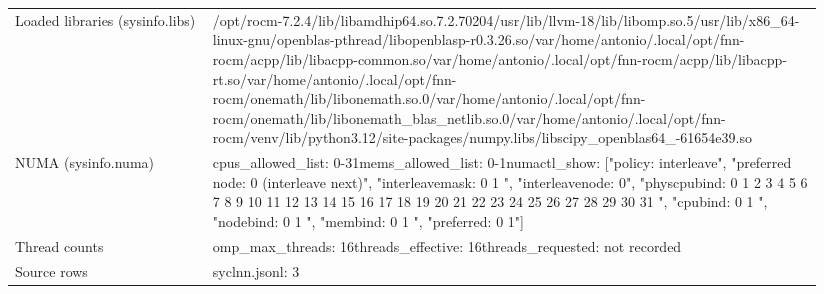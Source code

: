 \begin{longtable}{>{\raggedright\arraybackslash}p{0.23\linewidth}>{\raggedright\arraybackslash}p{0.71\linewidth}}
Loaded libraries (sysinfo.libs) & /\allowbreak{}opt/\allowbreak{}rocm-7.2.4/\allowbreak{}lib/\allowbreak{}libamdhip64.so.7.2.70204\newline /\allowbreak{}usr/\allowbreak{}lib/\allowbreak{}llvm-18/\allowbreak{}lib/\allowbreak{}libomp.so.5\newline /\allowbreak{}usr/\allowbreak{}lib/\allowbreak{}x86\_\allowbreak{}64-linux-gnu/\allowbreak{}openblas-pthread/\allowbreak{}libopenblasp-r0.3.26.so\newline /\allowbreak{}var/\allowbreak{}home/\allowbreak{}antonio/\allowbreak{}.local/\allowbreak{}opt/\allowbreak{}fnn-rocm/\allowbreak{}acpp/\allowbreak{}lib/\allowbreak{}libacpp-common.so\newline /\allowbreak{}var/\allowbreak{}home/\allowbreak{}antonio/\allowbreak{}.local/\allowbreak{}opt/\allowbreak{}fnn-rocm/\allowbreak{}acpp/\allowbreak{}lib/\allowbreak{}libacpp-rt.so\newline /\allowbreak{}var/\allowbreak{}home/\allowbreak{}antonio/\allowbreak{}.local/\allowbreak{}opt/\allowbreak{}fnn-rocm/\allowbreak{}onemath/\allowbreak{}lib/\allowbreak{}libonemath.so.0\newline /\allowbreak{}var/\allowbreak{}home/\allowbreak{}antonio/\allowbreak{}.local/\allowbreak{}opt/\allowbreak{}fnn-rocm/\allowbreak{}onemath/\allowbreak{}lib/\allowbreak{}libonemath\_\allowbreak{}blas\_\allowbreak{}netlib.so.0\newline /\allowbreak{}var/\allowbreak{}home/\allowbreak{}antonio/\allowbreak{}.local/\allowbreak{}opt/\allowbreak{}fnn-rocm/\allowbreak{}venv/\allowbreak{}lib/\allowbreak{}python3.12/\allowbreak{}site-packages/\allowbreak{}numpy.libs/\allowbreak{}libscipy\_\allowbreak{}openblas64\_\allowbreak{}-61654e39.so \\
NUMA (sysinfo.numa) & cpus\_\allowbreak{}allowed\_\allowbreak{}list: 0-31\newline mems\_\allowbreak{}allowed\_\allowbreak{}list: 0-1\newline numactl\_\allowbreak{}show: ["policy: interleave", "preferred node: 0 (interleave next)", "interleavemask: 0 1 ", "interleavenode: 0", "physcpubind: 0 1 2 3 4 5 6 7 8 9 10 11 12 13 14 15 16 17 18 19 20 21 22 23 24 25 26 27 28 29 30 31 ", "cpubind: 0 1 ", "nodebind: 0 1 ", "membind: 0 1 ", "preferred: 0 1"] \\
Thread counts & omp\_\allowbreak{}max\_\allowbreak{}threads: 16\newline threads\_\allowbreak{}effective: 16\newline threads\_\allowbreak{}requested: not recorded \\
Source rows & syclnn.jsonl: 3 \\
\end{longtable}
